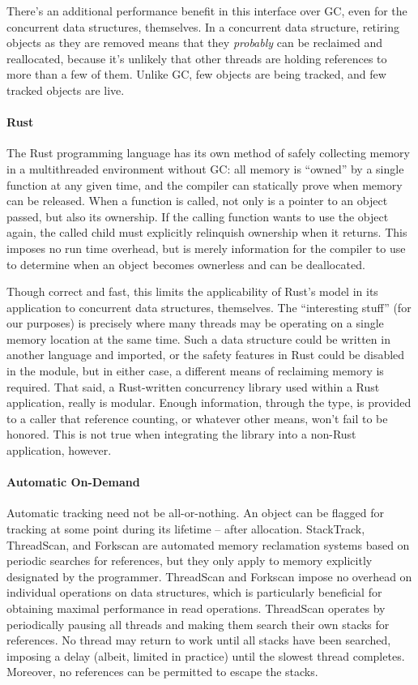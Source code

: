 There's an additional performance benefit in this interface over GC, even for the concurrent data structures, themselves.  In a concurrent data structure, retiring objects as they are removed means that they \textit{probably} can be reclaimed and reallocated, because it's unlikely that other threads are holding references to more than a few of them.  Unlike GC, few objects are being tracked, and few tracked objects are live.

\paragraph{Rust} The Rust programming language has its own method of safely collecting memory in a multithreaded environment without GC: all memory is ``owned'' by a single function at any given time, and the compiler can statically prove when memory can be released.\cite{Rust}  When a function is called, not only is a pointer to an object passed, but also its ownership.  If the calling function wants to use the object again, the called child must explicitly relinquish ownership when it returns.  This imposes no run time overhead, but is merely information for the compiler to use to determine when an object becomes ownerless and can be deallocated.

Though correct and fast, this limits the applicability of Rust's model in its application to concurrent data structures, themselves.  The ``interesting stuff'' (for our purposes) is precisely where many threads may be operating on a single memory location at the same time.  Such a data structure could be written in another language and imported, or the safety features in Rust could be disabled in the module, but in either case, a different means of reclaiming memory is required.  That said, a Rust-written concurrency library used within a Rust application, really is modular.  Enough information, through the type, is provided to a caller that reference counting, or whatever other means, won't fail to be honored.  This is not true when integrating the library into a non-Rust application, however.

\paragraph{Automatic On-Demand} Automatic tracking need not be all-or-nothing.  An object can be flagged for tracking at some point during its lifetime -- after allocation.  StackTrack\cite{StackTrack}, ThreadScan\cite{Threadscan}, and Forkscan\cite{Forkscan} are automated memory reclamation systems based on periodic searches for references, but they only apply to memory explicitly designated by the programmer.  ThreadScan and Forkscan impose no overhead on individual operations on data structures, which is particularly beneficial for obtaining maximal performance in read operations.  ThreadScan operates by periodically pausing all threads and making them search their own stacks for references.  No thread may return to work until all stacks have been searched, imposing a delay (albeit, limited in practice) until the slowest thread completes.  Moreover, no references can be permitted to escape the stacks.


